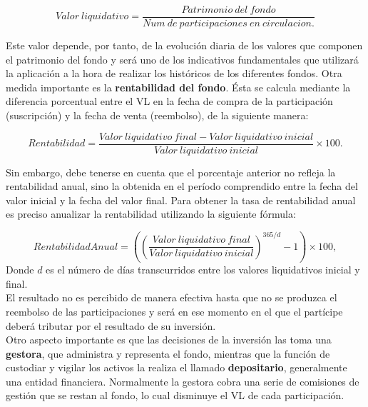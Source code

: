 \documentclass[12pt, a4paper]{book}
\begin{document}
\begin{center}
	\begin{equation}
	Valor\ liquidativo = \frac{ Patrimonio\ del\ fondo}{Num\ de\ participaciones\ en\ circulacion.}
	\end{equation}
	\label{valorliquidativo}
\end{center}
\vspace{1cm}

\newpage

Este valor depende, por tanto, de la evolución diaria de los valores que componen el patrimonio del fondo y será uno de los indicativos fundamentales que utilizará la aplicación a la hora de realizar los históricos de los diferentes fondos. Otra medida importante es la \textbf{rentabilidad del fondo}. Ésta se calcula mediante la diferencia porcentual entre el \gls{VL} en la fecha de compra de la participación (suscripción) y la fecha de venta (reembolso), de la siguiente manera:

\begin{center}
	\begin{equation}
	Rentabilidad = \frac{ Valor\ liquidativo\ final - Valor\ liquidativo\ inicial}{Valor\ liquidativo\ inicial } \times 100.
	\end{equation}
\end{center}

Sin embargo, debe tenerse en cuenta que el porcentaje anterior no refleja la rentabilidad anual, sino la obtenida en el período comprendido entre la fecha del valor inicial y la fecha del valor final. Para obtener la tasa de rentabilidad anual es preciso anualizar la rentabilidad utilizando la siguiente fórmula:

\begin{equation}
Rentabilidad Anual=\left(\left(\frac{ Valor\ liquidativo\ final}{Valor\ liquidativo\ inicial}\right)^{365/d}-1\right) \times 100,
\end{equation} 
Donde $d$ es el número de días transcurridos entre los valores liquidativos inicial y final.\\



El resultado no es percibido de manera efectiva hasta que no se produzca el reembolso de las participaciones y será en ese momento en el que el partícipe deberá tributar por el resultado de su inversión. \\


Otro aspecto importante es que las decisiones de la inversión las toma una \textbf{gestora}, que administra y representa el fondo, mientras que la función de custodiar y vigilar los activos la realiza el llamado \textbf{depositario}, generalmente una entidad financiera. Normalmente la gestora cobra una serie de comisiones de gestión que se restan al fondo, lo cual disminuye el \gls{VL} de cada participación.\\
\end{document}
